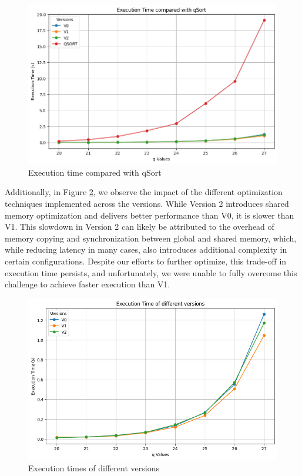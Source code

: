 \documentclass[a4paper,12pt]{article}
\begin{document}
\begin{figure}[H]
    \centering
    \includegraphics[width=0.8\linewidth]{assets/execution_time_qsort.png}
    \caption{Execution time compared with qSort}
    \label{fig:qSort}
\end{figure}

Additionally, in Figure \ref{fig:versions}, we observe the impact of the different optimization techniques implemented across the versions. While Version 2 introduces shared memory optimization and delivers better performance than V0, it is slower than V1. This slowdown in Version 2 can likely be attributed to the overhead of memory copying and synchronization between global and shared memory, which, while reducing latency in many cases, also introduces additional complexity in certain configurations. Despite our efforts to further optimize, this trade-off in execution time persists, and unfortunately, we were unable to fully overcome this challenge to achieve faster execution than V1.

\begin{figure}[H]
    \centering
    \includegraphics[width=0.8\linewidth]{assets/execution_time_versions.png}
    \caption{Execution times of different versions}
    \label{fig:versions}
\end{figure}
\end{document}
